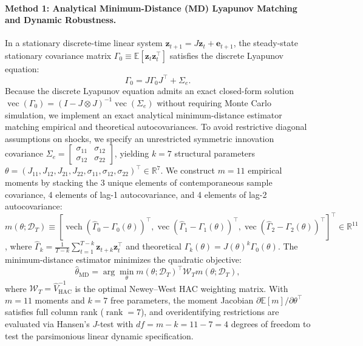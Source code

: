 \documentclass[12pt]{article}
\theoremstyle{definition}
\theoremstyle{remark}
\newcommand{\E}{\mathbb{E}}
\begin{document}
\paragraph{Method 1: Analytical Minimum-Distance (MD) Lyapunov Matching and Dynamic Robustness.}
In a stationary discrete-time linear system $\mathbf{z}_{t+1} = J \mathbf{z}_t + \mathbf{e}_{t+1}$, the steady-state stationary covariance matrix $\Gamma_0 \equiv \E[\mathbf{z}_t \mathbf{z}_t^\top]$ satisfies the discrete Lyapunov equation:
\begin{equation}
\Gamma_0 = J \Gamma_0 J^\top + \Sigma_e.
\label{eq:lyapunov_eq}
\end{equation}
Because the discrete Lyapunov equation admits an exact closed-form solution $\operatorname{vec}(\Gamma_0) = (I - J \otimes J)^{-1} \operatorname{vec}(\Sigma_e)$ without requiring Monte Carlo simulation, we implement an exact analytical minimum-distance estimator matching empirical and theoretical autocovariances. To avoid restrictive diagonal assumptions on shocks, we specify an unrestricted symmetric innovation covariance $\Sigma_e = \begin{bmatrix} \sigma_{11} & \sigma_{12} \\ \sigma_{12} & \sigma_{22} \end{bmatrix}$, yielding $k=7$ structural parameters $\theta = (J_{11}, J_{12}, J_{21}, J_{22}, \sigma_{11}, \sigma_{12}, \sigma_{22})^\top \in \mathbb{R}^7$. We construct $m=11$ empirical moments by stacking the 3 unique elements of contemporaneous sample covariance, 4 elements of lag-1 autocovariance, and 4 elements of lag-2 autocovariance: $m(\theta; \mathcal{D}_T) \equiv [\operatorname{vech}(\hat{\Gamma}_0 - \Gamma_0(\theta))^\top, \operatorname{vec}(\hat{\Gamma}_1 - \Gamma_1(\theta))^\top, \operatorname{vec}(\hat{\Gamma}_2 - \Gamma_2(\theta))^\top]^\top \in \mathbb{R}^{11}$, where $\hat{\Gamma}_k = \frac{1}{T-k} \sum_{t=1}^{T-k} \mathbf{z}_{t+k} \mathbf{z}_t^\top$ and theoretical $\Gamma_k(\theta) = J(\theta)^k \Gamma_0(\theta)$. The minimum-distance estimator minimizes the quadratic objective:
\begin{equation}
\hat{\theta}_{\text{MD}} = \arg\min_\theta m(\theta; \mathcal{D}_T)^\top \mathcal{W}_T m(\theta; \mathcal{D}_T),
\end{equation}
where $\mathcal{W}_T = \hat{V}_{\text{HAC}}^{-1}$ is the optimal Newey--West HAC weighting matrix. With $m=11$ moments and $k=7$ free parameters, the moment Jacobian $\partial \mathbb{E}[m]/\partial \theta^\top$ satisfies full column rank ($\operatorname{rank} = 7$), and overidentifying restrictions are evaluated via Hansen's $J$-test with $df = m - k = 11 - 7 = 4$ degrees of freedom to test the parsimonious linear dynamic specification.
\end{document}
